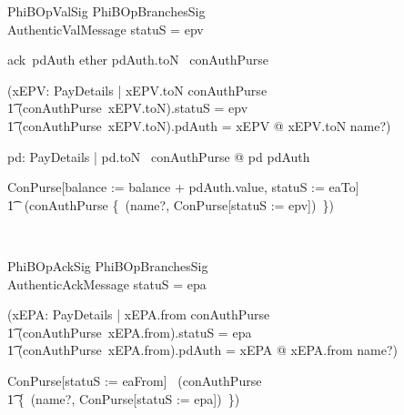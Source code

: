 \begin{LNewSDef}
\begin{schema}{PhiBOpValSig}
    PhiBOpBranchesSig \\
    AuthenticValMessage
\where
    statuS = epv
    \also

    ack~pdAuth \notin ether \implies pdAuth.toN \in \dom~conAuthPurse
    \also

    (\forall xEPV: PayDetails | xEPV.toN \in \dom conAuthPurse \\
         \t1 \land (conAuthPurse~xEPV.toN).statuS = epv \\
         \t1 \land (conAuthPurse~xEPV.toN).pdAuth = xEPV @ xEPV.toN \neq name?)
    \also

    \forall pd: PayDetails | pd.toN \in \dom~conAuthPurse @ pd \neq pdAuth
    \also

    \lnot \theta ConPurse[balance := balance + pdAuth.value, statuS := eaTo] \\
        \t1 \in \ran~(conAuthPurse \oplus \{~(name?, \theta ConPurse[statuS := epv])~\})
\end{schema}~\end{LNewSDef}

\begin{LNewSDef}
\begin{schema}{PhiBOpAckSig}
    PhiBOpBranchesSig \\
    AuthenticAckMessage
\where
    statuS = epa
    \also

    (\forall xEPA: PayDetails | xEPA.from \in \dom conAuthPurse \\
         \t1 \land (conAuthPurse~xEPA.from).statuS = epa \\
         \t1 \land (conAuthPurse~xEPA.from).pdAuth = xEPA @ xEPA.from \neq name?)
    \also

    \lnot \theta ConPurse[statuS := eaFrom] \in \ran~(conAuthPurse \oplus \\
        \t1 \{~(name?, \theta ConPurse[statuS := epa])~\})
\end{schema}~\end{LNewSDef}

